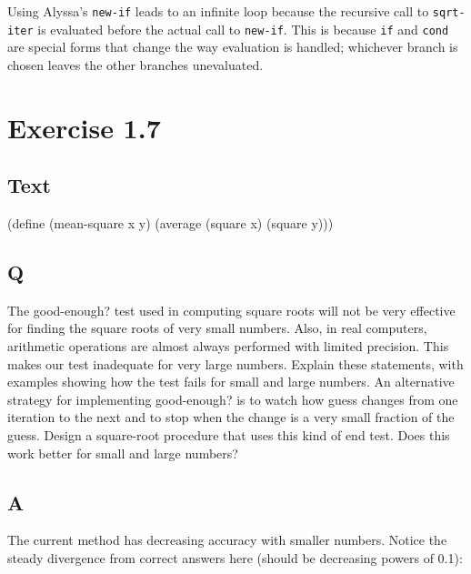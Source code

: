 \documentclass[
]{article}
\newenvironment{Shaded}{}{}
\newcommand{\ExtensionTok}[1]{#1}
\newcommand{\FunctionTok}[1]{\textcolor[rgb]{0.02,0.16,0.49}{#1}}
\newcommand{\NormalTok}[1]{#1}
\begin{document}
Using Alyssa's \texttt{new-if} leads to an infinite loop because the
recursive call to \texttt{sqrt-iter} is evaluated before the actual call
to \texttt{new-if}. This is because \texttt{if} and \texttt{cond} are
special forms that change the way evaluation is handled; whichever
branch is chosen leaves the other branches unevaluated.

\hypertarget{exercise-1.7}{%
\section{Exercise 1.7}\label{exercise-1.7}}

\hypertarget{text-1}{%
\subsection{Text}\label{text-1}}

\hypertarget{mean-square}{%
\label{mean-square}}%
\begin{Shaded}
\begin{Highlighting}[]
\NormalTok{(}\ExtensionTok{define}\FunctionTok{ }\NormalTok{(mean{-}square x y)}
\NormalTok{  (average (square x) (square y)))}
\end{Highlighting}
\end{Shaded}

\hypertarget{q-6}{%
\subsection{Q}\label{q-6}}

The good-enough? test used in computing square roots will not be very
effective for finding the square roots of very small numbers. Also, in
real computers, arithmetic operations are almost always performed with
limited precision. This makes our test inadequate for very large
numbers. Explain these statements, with examples showing how the test
fails for small and large numbers. An alternative strategy for
implementing good-enough? is to watch how guess changes from one
iteration to the next and to stop when the change is a very small
fraction of the guess. Design a square-root procedure that uses this
kind of end test. Does this work better for small and large numbers?

\hypertarget{a-6}{%
\subsection{A}\label{a-6}}

The current method has decreasing accuracy with smaller numbers. Notice
the steady divergence from correct answers here (should be decreasing
powers of 0.1):
\end{document}
